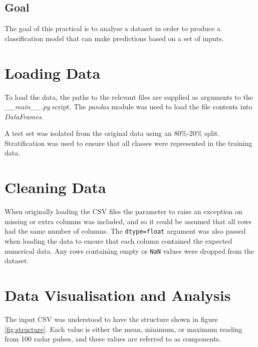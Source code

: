 \documentclass[12pt]{article}
\begin{document}
\begin{titlepage}

\vfill %

\end{titlepage}

\subsection*{Goal}

The goal of this practical is to analyse a dataset in order to produce a classification model that can make predictions based on a set of inputs.

\tableofcontents

\pagebreak
{}
\setcounter{page}{1} 

\section{Loading Data}

To load the data, the paths to the relevant files are supplied as arguments to the \emph{\_\_main\_\_.py} script. The \emph{pandas} module was used to load the file contents into \emph{DataFrames}.

A test set was isolated from the original data using an 80\%-20\% split. Stratification was used to ensure that all classes were represented in the training data. 


\section{Cleaning Data}

When originally loading the CSV files the parameter to raise an exception on missing or extra columns was included, and so it could be assumed that all rows had the same number of columns. The \lstinline{dtype=float} argument was also passed when loading the data to ensure that each column contained the expected numerical data. Any rows containing empty or \lstinline{NaN} values were dropped from the dataset.

\section{Data Visualisation and Analysis}

The input CSV was understood to have the structure shown in figure \ref{fig:structure}. Each value is either the mean, minimum, or maximum reading from 100 radar pulses, and these values are referred to as components.
\end{document}
